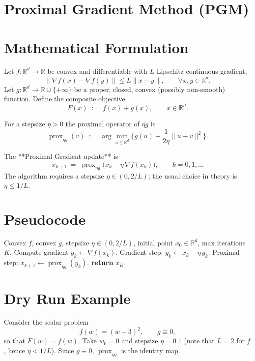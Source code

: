 \documentclass{article}
\newcommand{\prox}{\operatorname{prox}}
\newcommand{\R}{\mathbb{R}}
\begin{document}
\section*{Proximal Gradient Method (PGM)}

\section*{Mathematical Formulation}
Let $f:\R^{d}\!\to\!\R$ be convex and differentiable with $L$‑Lipschitz continuous gradient,
\[
\|\nabla f(x)-\nabla f(y)\|\le L\|x-y\|,\qquad\forall x,y\in\R^{d}.
\]
Let $g:\R^{d}\!\to\!\R\cup\{+\infty\}$ be a proper, closed, convex (possibly non‑smooth) function.
Define the composite objective
\[
F(x)\;:=\;f(x)+g(x),\qquad x\in\R^{d}.
\]

For a stepsize $\eta>0$ the proximal operator of $\eta g$ is
\[
\prox_{\eta g}(v)\;:=\;\arg\min_{u\in\R^{d}}\Big\{g(u)+\frac{1}{2\eta}\|u-v\|^{2}\Big\}.
\]

The **Proximal Gradient update** is
\begin{equation}
\label{eq:update}
x_{k+1}\;=\;\prox_{\eta g}\bigl(x_{k}-\eta\,\nabla f(x_{k})\bigr),\qquad k=0,1,\dots
\end{equation}
The algorithm requires a stepsize $\eta\in(0,2/L)$; the usual choice in theory is $\eta\le 1/L$.

\section*{Pseudocode}
\begin{algorithm}[H]
\caption{Proximal Gradient Method}
\begin{algorithmic}[1]
\Require Convex $f$, convex $g$, stepsize $\eta\in(0,2/L)$, initial point $x_{0}\in\R^{d}$, max iterations $K$.
    \State Compute gradient $g_{k}\gets\nabla f(x_{k})$.
    \State Gradient step: $y_{k}\gets x_{k}-\eta\,g_{k}$.
    \State Proximal step: $x_{k+1}\gets\prox_{\eta g}(y_{k})$.
\EndFor
\State \textbf{return} $x_{K}$.
\end{algorithmic}
\end{algorithm}

\section*{Dry Run Example}
Consider the scalar problem
\[
f(w)=(w-3)^{2},\qquad g\equiv0,
\]
so that $F(w)=f(w)$.  
Take $w_{0}=0$ and stepsize $\eta=0.1$ (note that $L=2$ for $f$, hence $\eta<1/L$).  
Since $g\equiv0$, $\prox_{\eta g}$ is the identity map.
\end{document}
